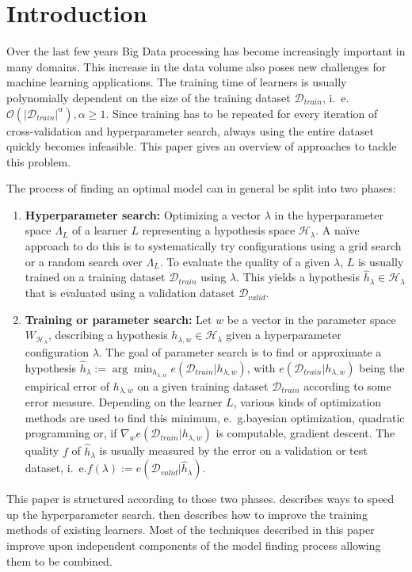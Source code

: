 \chapter{Introduction}%
\label{sec:intro}

\setcounter{page}{1}			%

Over the last few years Big Data processing has become increasingly important in many domains.
This increase in the data volume also poses new challenges for machine learning applications.
The training time of learners is usually polynomially dependent on the size of the training dataset \(\mathcal{D}_{\mathit{train}}\), i.~e. \(\mathcal{O}(|\mathcal{D}_{\mathit{train}}|^\alpha), \alpha \geq 1\).
Since training has to be repeated for every iteration of cross-validation and hyperparameter search, always using the entire dataset quickly becomes infeasible.
This paper gives an overview of approaches to tackle this problem.

The process of finding an optimal model can in general be split into two phases:
\begin{enumerate}
	\item \textbf{Hyperparameter search:}
		Optimizing a vector \(\lambda\) in the hyperparameter space \(\Lambda_L\) of a learner \(L\) representing a hypothesis space \(\mathcal{H}_{\lambda}\).
		A na\"ive approach to do this is to systematically try configurations using a grid search or a random search over \(\Lambda_L\).
		To evaluate the quality of a given \(\lambda\), \(L\) is usually trained on a training dataset \(\mathcal{D}_{\mathit{train}}\) using \(\lambda\). This yields a hypothesis \(\hat{h}_\lambda \in \mathcal{H}_{\lambda}\) that is evaluated using a validation dataset \(\mathcal{D}_{\mathit{valid}}\).
	\item \textbf{Training or parameter search:}
		Let \(w\) be a vector in the parameter space \(W_{\mathcal{H}_\lambda}\), describing a hypothesis \(h_{\lambda, w} \in \mathcal{H}_\lambda\) given a hyperparameter configuration \(\lambda\).
		The goal of parameter search is to find or approximate a hypothesis \(\hat{h}_\lambda := \arg\min_{h_{\lambda, w}}{e(\mathcal{D}_{\mathit{train}} | h_{\lambda, w})}\), with \(e(\mathcal{D}_{\mathit{train}} | h_{\lambda, w})\) being the empirical error of \(h_{\lambda, w}\) on a given training dataset \(\mathcal{D}_{\mathit{train}}\) according to some error measure.
		Depending on the learner \(L\), various kinds of optimization methods are used to find this minimum, e.~g.\@ bayesian optimization, quadratic programming or, if \(\nabla_w e(\mathcal{D}_{\mathit{train}} | h_{\lambda, w})\) is computable, gradient descent.
		The quality \(f\) of \(\hat{h}_\lambda\) is usually measured by the error on a validation or test dataset, i.~e.\@ \(f(\lambda) := e(\mathcal{D}_{\mathit{valid}} | \hat{h}_\lambda)\).
\end{enumerate}
This paper is structured according to those two phases.
 describes ways to speed up the hyperparameter search.
 then describes how to improve the training methods of existing learners.
Most of the techniques described in this paper improve upon independent components of the model finding process allowing them to be combined.
